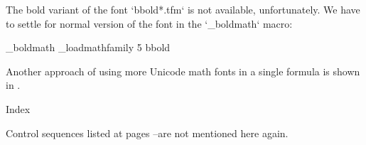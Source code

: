 The bold variant of the font `bbold*.tfm` is not available, unfortunately.
We have to settle for normal version of the font in the `\_boldmath` macro:

\begtt \typosize[10/12]
   \addto \_boldmath {\_loadmathfamily 5 bbold }
\endtt

Another approach of using more Unicode math fonts in a single formula is
shown in
.

\sec Index

Control sequences listed at pages \pgref[listA]--\pgref[listB] are not
mentioned here again.

\makeindex
\endmulti

\bye
